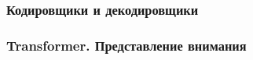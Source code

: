 

\subsubsection{Кодировщики и декодировщики}



\subsubsection{Transformer. Представление внимания}




% 